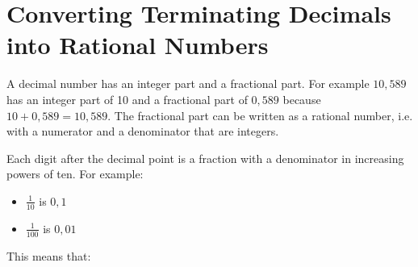     \section{ Converting Terminating Decimals into Rational Numbers}
            \nopagebreak
      \label{m38348*id63646}A decimal number has an integer part and a fractional part. For example $10,589$ has an integer part of 10 and a fractional part of $0,589$ because $10+0,589=10,589$. The fractional part can be written as a rational number, i.e. with a numerator and a denominator that are integers.\par 
      \label{m38348*id63704}Each digit after the decimal point is a fraction with a denominator in increasing powers of ten. For example:\par 
      \label{m38348*id63708}\begin{itemize}[noitemsep]
            \label{m38348*uid18}\item $\frac{1}{10}$ is $0,1$\label{m38348*uid19}\item $\frac{1}{100}$ is $0,01$\end{itemize}
      \label{m38348*id63781}This means that:\par 
      \label{m38348*id63784}\nopagebreak\noindent{}
